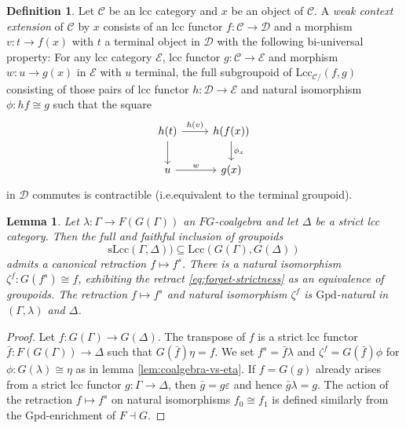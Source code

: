 \documentclass{article}
\newtheorem{lemma}{Lemma}
\theoremstyle{remark}
\theoremstyle{definition}
\newtheorem{definition}{Definition}
\begin{document}
\begin{definition}
  \label{def:weak-ext}
  Let $\mathcal{C}$ be an lcc category and $x$ be an object of $\mathcal{C}$.
  A \emph{weak context extension} of $\mathcal{C}$ by $x$ consists of an lcc functor $f : \mathcal{C} \rightarrow \mathcal{D}$ and a morphism $v : t \rightarrow f(x)$ with $t$ a terminal object in $\mathcal{D}$ with the following bi-universal property:
  For any lcc category $\mathcal{E}$, lcc functor $g : \mathcal{C} \rightarrow \mathcal{E}$ and morphism $w : u \rightarrow g(x)$ in $\mathcal{E}$ with $u$ terminal, the full subgroupoid of $\mathrm{Lcc}_{\mathcal{C} /}(f, g)$ consisting of those pairs of lcc functor $h : \mathcal{D} \rightarrow \mathcal{E}$ and natural isomorphism $\phi : hf \cong g$ such that the square
  \begin{equation}
    \begin{tikzcd}
      h(t) \arrow[d] \arrow[r, "h(v)"] & h(f(x)) \arrow[d, "\phi_x"] \\
      u \arrow[r, "w"] & g(x)
    \end{tikzcd}
  \end{equation}
  in $\mathcal{D}$ commutes is contractible (i.e.\@ equivalent to the terminal groupoid).
\end{definition}

\begin{lemma}
  \label{lem:strictification}
  Let $\lambda : \Gamma \rightarrow F(G(\Gamma))$ an $FG$-coalgebra and let $\Delta$ be a strict lcc category.
  Then the full and faithful inclusion of groupoids
  \begin{equation}
    \label{eq:forget-strictness}
    \mathrm{sLcc}(\Gamma, \Delta)) \subseteq \mathrm{Lcc}(G(\Gamma), G(\Delta))
  \end{equation}
  admits a canonical retraction $f \mapsto f^s$.
  There is a natural isomorphism $\zeta^f : G(f^s) \cong f$, exhibiting the retract \eqref{eq:forget-strictness} as an equivalence of groupoids.
  The retraction $f \mapsto f^s$ and natural isomorphism $\zeta^f$ is $\mathrm{Gpd}$-natural in $(\Gamma, \lambda)$ and $\Delta$.
\end{lemma}
\begin{proof}
  Let $f : G(\Gamma) \rightarrow G(\Delta)$.
  The transpose of $f$ is a strict lcc functor $\bar f : F(G(\Gamma)) \rightarrow \Delta$ such that $G(\bar f) \eta = f$.
  We set $f^s = \bar f \lambda$ and $\zeta^f = G(\bar f) \phi$ for $\phi : G(\lambda) \cong \eta$ as in lemma \ref{lem:coalgebra-vs-eta}.
  If $f = G(g)$ already arises from a strict lcc functor $g : \Gamma \rightarrow \Delta$, then $\bar g = g \varepsilon$ and hence $\bar g \lambda = g$.
  The action of the retraction $f \mapsto f^s$ on natural isomorphisms $f_0 \cong f_1$ is defined similarly from the $\mathrm{Gpd}$-enrichment of $F \dashv G$.
\end{proof}
\end{document}
